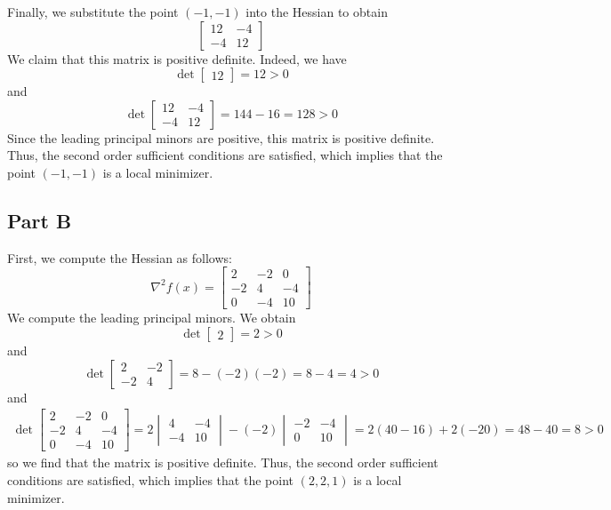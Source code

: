 \documentclass[12pt]{article}
\begin{document}
Finally, we substitute the point $(-1,-1)$ into the Hessian to obtain
\[
\begin{bmatrix}
12 & -4\\
-4 & 12
\end{bmatrix}
\] We claim that this matrix is positive definite. Indeed, we have
\[
\det \begin{bmatrix}
12
\end{bmatrix} = 12 > 0
\] and
\[
\det \begin{bmatrix}
12 & -4\\
-4 & 12
\end{bmatrix} = 144 - 16 = 128 > 0
\] Since the leading principal minors are positive, this matrix is positive definite. Thus, the second order sufficient conditions are satisfied, which implies that the point $(-1,-1)$ is a local minimizer.
\newpage
\subsection*{Part B}
First, we compute the Hessian as follows:
\[
\nabla^2 f(x) = \begin{bmatrix}
2 & -2 & 0\\
-2 & 4 & -4\\
0 & -4 & 10
\end{bmatrix}
\] We compute the leading principal minors. We obtain
\[
\det \begin{bmatrix} 2
\end{bmatrix}  = 2 > 0
\] and
\[
\det  \begin{bmatrix}
2 & -2\\
-2 & 4
\end{bmatrix} = 8 - (-2)(-2) = 8 - 4 = 4 > 0
\] and
\begin{align*}
\det \begin{bmatrix}
2 & -2 & 0\\
-2 & 4 & -4\\
0 & -4 & 10
\end{bmatrix} = 
2 \begin{vmatrix}
4 & -4\\
-4 & 10
\end{vmatrix}
- (-2) \begin{vmatrix}
-2 & -4\\
0 & 10
\end{vmatrix} = 2(40 - 16) + 2(-20) = 48 - 40 = 8 > 0
\end{align*} so we find that the matrix is positive definite. Thus, the second order sufficient conditions are satisfied, which implies that the point $(2,2,1)$ is a local minimizer.
\newpage
\end{document}
